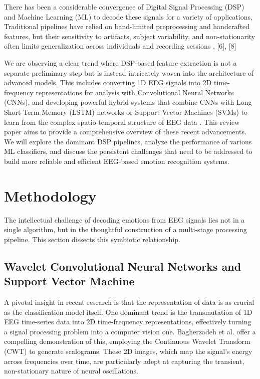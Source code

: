\documentclass[conference]{IEEEtran}
\begin{document}
There has been a considerable convergence of Digital Signal Processing (DSP) and Machine Learning (ML) to decode these signals for a variety of applications, Traditional pipelines have relied on band-limited preprocessing and handcrafted features, but their sensitivity to artifacts, subject variability, and non-stationarity often limits generalization across individuals and recording sessions \cite{b3}, [6], [8] 

 We are observing a clear trend where DSP-based feature extraction is not a separate preliminary step but is instead intricately woven into the architecture of advanced models. This includes converting 1D EEG signals into 2D time-frequency representations for analysis with Convolutional Neural Networks (CNNs), and developing powerful hybrid systems that combine CNNs with Long Short-Term Memory (LSTM) networks or Support Vector Machines (SVMs) to learn from the complex spatio-temporal structure of EEG data \cite{b2, b4}. This review paper aims to provide a comprehensive overview of these recent advancements. We will explore the dominant DSP pipelines, analyze the performance of various ML classifiers, and discuss the persistent challenges that need to be addressed to build more reliable and efficient EEG-based emotion recognition systems.

\section{Methodology}
The intellectual challenge of decoding emotions from EEG signals lies not in a single algorithm, but in the thoughtful construction of a multi-stage processing pipeline. This section dissects this symbiotic relationship.

\subsection{Wavelet Convolutional Neural Networks and Support Vector Machine}
A pivotal insight in recent research is that the representation of data is as crucial as the classification model itself. One dominant trend is the transmutation of 1D EEG time-series data into 2D time-frequency representations, effectively turning a signal processing problem into a computer vision one. Bagherzadeh et al. \cite{b1} offer a compelling demonstration of this, employing the Continuous Wavelet Transform (CWT) to generate scalograms. These 2D images, which map the signal's energy across frequencies over time, are particularly adept at capturing the transient, non-stationary nature of neural oscillations.
\end{document}
